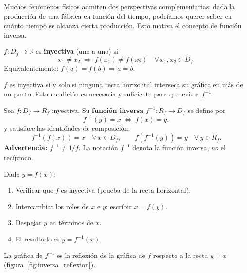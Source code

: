 Muchos fenómenos físicos admiten dos perspectivas complementarias: dada la producción de una fábrica en función del tiempo, podríamos querer saber en cuánto tiempo se alcanza cierta producción. Esto motiva el concepto de función inversa.

\begin{definition}
$f: D_f \to \mathbb{R}$ es \textbf{inyectiva} (uno a uno) si
\[
  x_1 \neq x_2 \;\Rightarrow\; f(x_1) \neq f(x_2) \quad \forall\, x_1, x_2 \in D_f.
\]
Equivalentemente: $f(a) = f(b) \Rightarrow a = b$.
\end{definition}

\begin{rem}
$f$ es inyectiva si y solo si ninguna recta horizontal interseca su gráfica en más de un punto. Esta condición es necesaria y suficiente para que exista $f^{-1}$.
\end{rem}

\begin{definition}
Sea $f: D_f \to R_f$ inyectiva. Su \textbf{función inversa} $f^{-1}: R_f \to D_f$ se define por
\[
  f^{-1}(y) = x \;\Longleftrightarrow\; f(x) = y,
\]
y satisface las identidades de composición:
\[
  f^{-1}(f(x)) = x \quad \forall\, x \in D_f, \qquad f(f^{-1}(y)) = y \quad \forall\, y \in R_f.
\]
\textbf{Advertencia:} $f^{-1} \neq 1/f$. La notación $f^{-1}$ denota la función inversa, \emph{no} el recíproco.
\end{definition}

\begin{rem}
Dado $y = f(x)$:
\begin{enumerate}
  \item Verificar que $f$ es inyectiva (prueba de la recta horizontal).
  \item Intercambiar los roles de $x$ e $y$: escribir $x = f(y)$.
  \item Despejar $y$ en términos de $x$.
  \item El resultado es $y = f^{-1}(x)$.
\end{enumerate}
La gráfica de $f^{-1}$ es la reflexión de la gráfica de $f$ respecto a la recta $y = x$ (figura~\ref{fig:inversa_reflexion}).
\end{rem}

